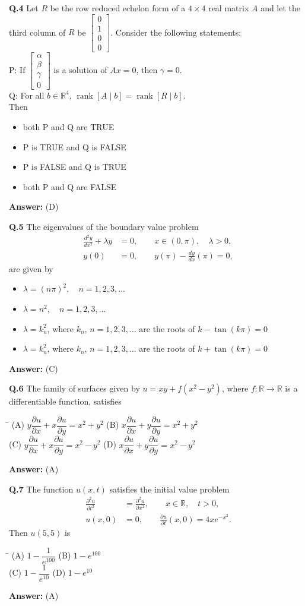 \documentclass[11pt,a4paper]{article}
\newcommand{\optsfourA}[4]{%
  \begin{tabbing}
    \hspace{0.48\linewidth}\=\kill
    (A) #1 \> (B) #2 \\[2pt]
    (C) #3 \> (D) #4
  \end{tabbing}%
}
\newcommand{\optslistA}[4]{%
  \begin{itemize}
    \setlength{\itemsep}{2pt}\setlength{\parskip}{0pt}
    \item[(A)] #1
    \item[(B)] #2
    \item[(C)] #3
    \item[(D)] #4
  \end{itemize}%
}
\newcommand{\ans}[1]{\textbf{Answer:} #1\par\medskip}
\begin{document}
\textbf{Q.4} Let $R$ be the row reduced echelon form of a $4 \times 4$ real matrix $A$ and let the third column of $R$ be $\begin{bmatrix} 0 \\ 1 \\ 0 \\ 0 \end{bmatrix}$. Consider the following statements:\\
P: If $\begin{bmatrix} \alpha \\ \beta \\ \gamma \\ 0 \end{bmatrix}$ is a solution of $Ax = 0$, then $\gamma = 0$.\\
Q: For all $b \in \mathbb{R}^4$, $\operatorname{rank}[A \mid b] = \operatorname{rank}[R \mid b]$.\\
Then
\optslistA{both P and Q are TRUE}{P is TRUE and Q is FALSE}{P is FALSE and Q is TRUE}{both P and Q are FALSE}
\ans{(D)}

\textbf{Q.5} The eigenvalues of the boundary value problem
\begin{align*}
  \frac{d^2 y}{dx^2} + \lambda y &= 0, \qquad x \in (0, \pi),\quad \lambda > 0, \\
  y(0) &= 0, \qquad y(\pi) - \frac{dy}{dx}(\pi) = 0,
\end{align*}
are given by
\optslistA{$\lambda = (n\pi)^2,\quad n = 1, 2, 3, \dots$}{$\lambda = n^2,\quad n = 1, 2, 3, \dots$}{$\lambda = k_n^2$, where $k_n$, $n = 1, 2, 3, \dots$ are the roots of $k - \tan(k\pi) = 0$}{$\lambda = k_n^2$, where $k_n$, $n = 1, 2, 3, \dots$ are the roots of $k + \tan(k\pi) = 0$}
\ans{(C)}

\textbf{Q.6} The family of surfaces given by $u = xy + f(x^2 - y^2)$, where $f : \mathbb{R} \to \mathbb{R}$ is a differentiable function, satisfies
\optsfourA{$y\dfrac{\partial u}{\partial x} + x\dfrac{\partial u}{\partial y} = x^2 + y^2$}{$x\dfrac{\partial u}{\partial x} + y\dfrac{\partial u}{\partial y} = x^2 + y^2$}{$y\dfrac{\partial u}{\partial x} + x\dfrac{\partial u}{\partial y} = x^2 - y^2$}{$x\dfrac{\partial u}{\partial x} + y\dfrac{\partial u}{\partial y} = x^2 - y^2$}
\ans{(A)}

\textbf{Q.7} The function $u(x, t)$ satisfies the initial value problem
\begin{align*}
  \frac{\partial^2 u}{\partial t^2} &= \frac{\partial^2 u}{\partial x^2}, \qquad x \in \mathbb{R},\quad t > 0, \\
  u(x, 0) &= 0, \qquad \frac{\partial u}{\partial t}(x, 0) = 4x e^{-x^2}.
\end{align*}
Then $u(5, 5)$ is
\optsfourA{$1 - \dfrac{1}{e^{100}}$}{$1 - e^{100}$}{$1 - \dfrac{1}{e^{10}}$}{$1 - e^{10}$}
\ans{(A)}
\end{document}
